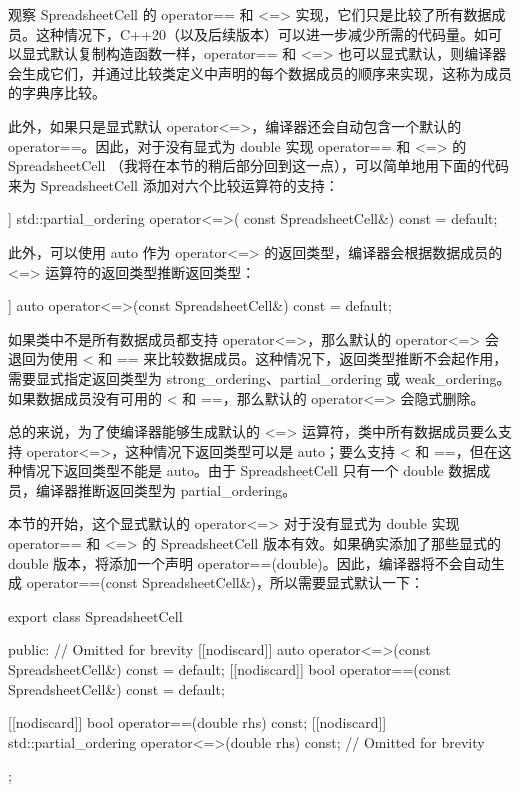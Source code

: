 
观察 SpreadsheetCell 的 operator== 和 <=> 实现，它们只是比较了所有数据成员。这种情况下，C++20（以及后续版本）可以进一步减少所需的代码量。如可以显式默认复制构造函数一样，operator== 和 <=> 也可以显式默认，则编译器会生成它们，并通过比较类定义中声明的每个数据成员的顺序来实现，这称为成员的字典序比较。

此外，如果只是显式默认 operator<=>，编译器还会自动包含一个默认的 operator==。因此，对于没有显式为 double 实现 operator== 和 <=> 的 SpreadsheetCell （我将在本节的稍后部分回到这一点），可以简单地用下面的代码来为 SpreadsheetCell 添加对六个比较运算符的支持：

\begin{cpp}
[[nodiscard]] std::partial_ordering operator<=>(
    const SpreadsheetCell&) const = default;
\end{cpp}

此外，可以使用 auto 作为 operator<=> 的返回类型，编译器会根据数据成员的 <=> 运算符的返回类型推断返回类型：

\begin{cpp}
[[nodiscard]] auto operator<=>(const SpreadsheetCell&) const = default;
\end{cpp}

如果类中不是所有数据成员都支持 operator<=>，那么默认的 operator<=> 会退回为使用 < 和 == 来比较数据成员。这种情况下，返回类型推断不会起作用，需要显式指定返回类型为 strong\_ordering、partial\_ordering 或 weak\_ordering。如果数据成员没有可用的 < 和 ==，那么默认的 operator<=> 会隐式删除。

总的来说，为了使编译器能够生成默认的 <=> 运算符，类中所有数据成员要么支持 operator<=>，这种情况下返回类型可以是 auto；要么支持 < 和 ==，但在这种情况下返回类型不能是 auto。由于 SpreadsheetCell 只有一个 double 数据成员，编译器推断返回类型为 partial\_ordering。

本节的开始，这个显式默认的 operator<=> 对于没有显式为 double 实现 operator== 和 <=> 的 SpreadsheetCell 版本有效。如果确实添加了那些显式的 double 版本，将添加一个声明 operator==(double)。因此，编译器将不会自动生成 operator==(const SpreadsheetCell\&)，所以需要显式默认一下：

\begin{cpp}
export class SpreadsheetCell
{
    public:
        // Omitted for brevity
        [[nodiscard]] auto operator<=>(const SpreadsheetCell&) const = default;
        [[nodiscard]] bool operator==(const SpreadsheetCell&) const = default;

        [[nodiscard]] bool operator==(double rhs) const;
        [[nodiscard]] std::partial_ordering operator<=>(double rhs) const;
        // Omitted for brevity
};
\end{cpp}

